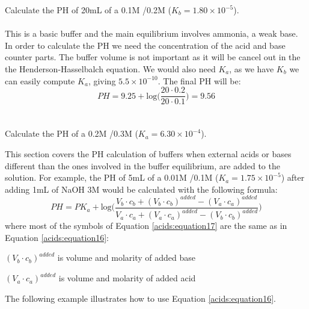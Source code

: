 \documentclass[main.tex]{subfiles}
\newcommand\chapterlabel{acids}
\begin{document}
\begin{description}
\begin{example} %
Calculate the PH of 20mL of a 0.1M /0.2M  ($K_b=1.80 \times 10^{-5}$). \\
\\
This is a basic buffer and the main equilibrium involves ammonia, a weak base. In order to calculate the PH we need the concentration of the acid and base counter parts. The buffer volume is not important as it will be cancel out in the the Henderson-Hasselbalch equation. We would also need $K_a$, as we have  $K_b$ we can easily compute $K_a$, giving $5.5\times 10^{-10}$. The final PH will be:
\[ PH=9.25 + \text{log} \Big(\frac{20\cdot 0.2}{20\cdot 0.1}\Big)=9.56 	\]
\\
\faDiamond\ \\
Calculate the PH of a 0.2M /0.3M  ($K_a=6.30 \times 10^{-4}$).
\end{example}%

\item[\docfilehook{\smallpencil PH of Buffer solution mixed with acids or bases}{PH of Buffer solution mixed with acids or bases}] This section covers the PH calculation of buffers when external acids or bases different than the ones involved in the buffer equilibrium, are added to the solution. For example, the PH of 5mL of a 0.01M /0.1M  ($K_a=1.75 \times 10^{-5}$) after adding 1mL of NaOH 3M would be calculated with the following formula:
\begin{equation}
\boxed{ PH=PK_a + \text{log} \Big(\frac{V_b\cdot c_b + (V_b\cdot c_b)^{added} - (V_a\cdot c_a)^{added} }{V_a\cdot c_a + (V_a\cdot c_a)^{added}  -(V_b\cdot c_b)^{added}    }\Big) }\label{\chapterlabel:equation17}
\end{equation}
where most of the symbols of Equation \ref{\chapterlabel:equation17} are the same as in Equation \ref{\chapterlabel:equation16}:
\begin{where}
 \item $(V_b\cdot c_b)^{added}$  is volume and molarity of added base
 \item $(V_a\cdot c_a)^{added}$  is volume and molarity of added acid
\end{where}
The following example illustrates how to use Equation \ref{\chapterlabel:equation16}.



\end{description}
\end{document}
